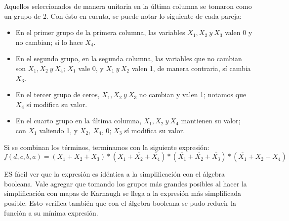 Aquellos seleccionados de manera unitaria en la última columna se tomaron como un grupo de 2.
Con ésto en cuenta, se puede notar lo siguiente de cada pareja:
\begin{itemize}
	\item En el primer grupo de la primera columna, las variables \(X_1, X_2~y~X_3\) valen 0 y no cambian; sí lo hace \(X_4\).
	\item En el segundo grupo, en la segunda columna, las variables que no cambian son \(X_1, X_2~y~X_4\); \(X_1\) vale 0, y \(X_1~y~X_2 \) valen 1, de manera contraria, sí cambia \(X_3\).
	\item En el tercer grupo de ceros, $X_1, X_2~y~X_3$ no cambian y valen 1; notamos que \(X_4\) sí modifica su valor.
	\item En el cuarto grupo en la última columna, $X_1, X_2~y~X_4$ mantienen su valor; con \(X_1\) valiendo 1, y \(X_2,~X_4\), 0; \(X_3\) sí modifica su valor.
\end{itemize}
\vspace{5mm}


\vspace{5mm}
Si se combinan los términos, terminamos con la siguiente expresión:
\vspace{5mm}
\begin{dmath}
	f(d,c,b,a)={(X_{1}+X_{2}+X_{3})}*{(X_1+\overline{X_2}+\overline{X_4})}*{(\overline{X_1}+\overline{X_2}+\overline{X_3})}*{(\overline{X_1}+X_2+X_4)}
\end{dmath}
\vspace{5mm}

ES fácil ver que la expresión es idéntica a la simplificación con el álgebra booleana. Vale agregar que tomando los grupos más grandes posibles al hacer la simplificación con mapas de Karnaugh se llega a la expresión más simplificada posible. Esto verifica también que con el álgebra booleana se pudo reducir la función a su mínima expresión.


